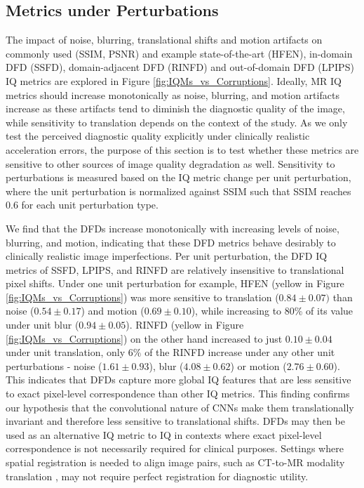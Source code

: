 \documentclass[AMA,STIX2COL,Linenumberson]{MRM}
\begin{document}
\subsection{Metrics under Perturbations}
 The impact of noise, blurring, translational shifts and motion artifacts on commonly used (SSIM, PSNR) and example state-of-the-art (HFEN), in-domain DFD (SSFD), domain-adjacent DFD (RINFD) and out-of-domain DFD (LPIPS) IQ metrics  are explored in Figure \ref{fig:IQMs_vs_Corruptions}. Ideally, MR IQ metrics should increase monotonically as noise, blurring, and motion artifacts increase as these artifacts tend to diminish the diagnostic quality of the image, while sensitivity to translation depends on the context of the study. As we only test the perceived diagnostic quality explicitly under clinically realistic acceleration errors, the purpose of this section is to test whether these metrics are sensitive to other sources of image quality degradation as well. Sensitivity to perturbations is measured based on the IQ metric change per unit perturbation, where the unit perturbation is normalized against SSIM such that SSIM reaches 0.6 for each unit perturbation type.
 
 We find that the DFDs increase monotonically with increasing levels of noise, blurring, and motion, indicating that these DFD metrics behave desirably to clinically realistic image imperfections. Per unit perturbation, the DFD IQ metrics of SSFD, LPIPS, and RINFD are relatively insensitive to translational pixel shifts. Under one unit perturbation for example, HFEN (yellow in Figure \ref{fig:IQMs_vs_Corruptions}) was more sensitive to translation ($0.84 \pm 0.07)$ than noise ($0.54 \pm 0.17$) and motion ($0.69 \pm 0.10$), while increasing to 80\% of its value under unit blur ($0.94 \pm 0.05$). RINFD (yellow in Figure \ref{fig:IQMs_vs_Corruptions}) on the other hand increased to just $0.10 \pm 0.04$ under unit translation, only $6\%$ of the RINFD increase under any other unit perturbations - noise ($1.61 \pm 0.93$), blur ($4.08 \pm 0.62$) or motion ($2.76 \pm 0.60$). This indicates that DFDs capture more global IQ features that are less sensitive to exact pixel-level correspondence than other IQ metrics. This finding confirms our hypothesis that the convolutional nature of CNNs make them translationally invariant and therefore less sensitive to translational shifts. DFDs may then be used as an alternative IQ metric to IQ in contexts where exact pixel-level correspondence is not necessarily required for clinical purposes. Settings where spatial registration is needed to align image pairs, such as CT-to-MR modality translation \cite{li2020magnetic, jin2019deep}, may not require perfect registration for diagnostic utility. 
\end{document}
